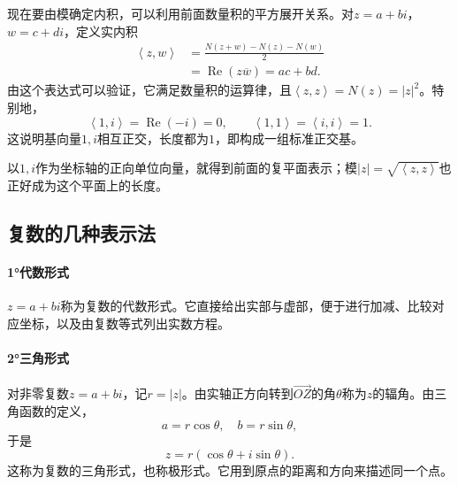 现在要由模确定内积，可以利用前面数量积的平方展开关系。对\(z = a + b i\)，\(w = c + d i\)，定义实内积
\begin{equation}
    \begin{aligned}
        \left\langle z , w \right\rangle
        &= \frac{N \left( z + w \right) - N \left( z \right) - N \left( w \right)}{2} \\
        &= \operatorname{Re} \left( z \overline{w} \right) = a c + b d .
    \end{aligned}
\end{equation}
由这个表达式可以验证，它满足数量积的运算律，且\(\left\langle z , z \right\rangle = N \left( z \right) = \left| z \right|^{2}\)。特别地，
\begin{equation}
    \left\langle 1 , i \right\rangle = \operatorname{Re} \left( - i \right) = 0 , \qquad
    \left\langle 1 , 1 \right\rangle = \left\langle i , i \right\rangle = 1 .
\end{equation}
这说明基向量\(1 , i\)相互正交，长度都为\(1\)，即构成一组{\heiti{}标准正交基}。

以\(1 , i\)作为坐标轴的正向单位向量，就得到前面的复平面表示；模\(\left| z \right| = \sqrt{\left\langle z , z \right\rangle}\)也正好成为这个平面上的长度。

\subsection{复数的几种表示法}
\paragraph{1°代数形式} \mbox{}\nopagebreak[4]

\(z = a + b i\)称为复数的{\heiti{}代数形式}。它直接给出实部与虚部，便于进行加减、比较对应坐标，以及由复数等式列出实数方程。

\paragraph{2°三角形式} \mbox{}\nopagebreak[4]

对非零复数\(z = a + b i\)，记\(r = \left| z \right|\)。由实轴正方向转到\(\vec{O Z}\)的角\(\theta\)称为\(z\)的{\heiti{}辐角}。由三角函数的定义，
\begin{equation}
    a = r \cos \theta , \quad b = r \sin \theta ,
\end{equation}
于是
\begin{equation}\label{eq:complex-trig}
    z = r \left( \cos \theta + i \sin \theta \right) .
\end{equation}
这称为复数的{\heiti{}三角形式}，也称极形式。它用到原点的距离和方向来描述同一个点。


